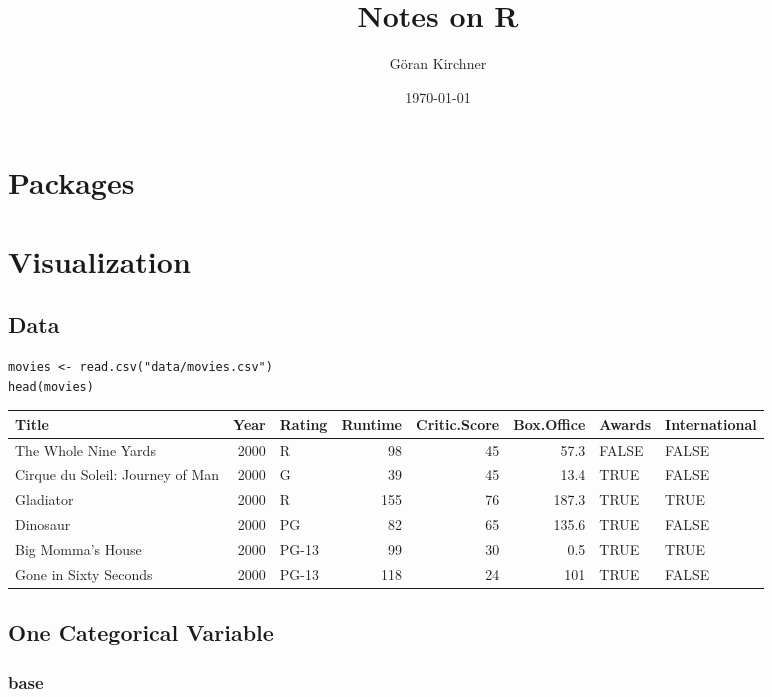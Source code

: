 \documentclass[a4paper, captions=tableheading]{tufte-book}
\author{Göran Kirchner}
\date{\today}
\title{Notes on R}
\begin{document}
\maketitle

\chapter{Packages}
\label{sec:orgheadline1}

\chapter{Visualization}
\label{sec:orgheadline15}

\section{Data}
\label{sec:orgheadline2}

\begin{verbatim}
movies <- read.csv("data/movies.csv")
head(movies)
\end{verbatim}

\begin{center}
\begin{tabular}{lrlrrrll}
\toprule
Title & Year & Rating & Runtime & Critic.Score & Box.Office & Awards & International\\
\midrule
The Whole Nine Yards & 2000 & R & 98 & 45 & 57.3 & FALSE & FALSE\\
Cirque du Soleil: Journey of Man & 2000 & G & 39 & 45 & 13.4 & TRUE & FALSE\\
Gladiator & 2000 & R & 155 & 76 & 187.3 & TRUE & TRUE\\
Dinosaur & 2000 & PG & 82 & 65 & 135.6 & TRUE & FALSE\\
Big Momma's House & 2000 & PG-13 & 99 & 30 & 0.5 & TRUE & TRUE\\
Gone in Sixty Seconds & 2000 & PG-13 & 118 & 24 & 101 & TRUE & FALSE\\
\bottomrule
\end{tabular}
\end{center}

\section{One Categorical Variable}
\label{sec:orgheadline6}

\subsection{base}
\label{sec:orgheadline3}
\end{document}
